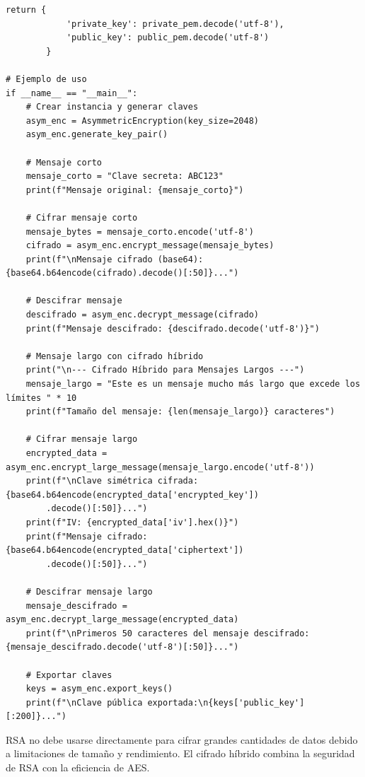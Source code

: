 \documentclass[12pt,a4paper]{article}
\begin{document}
\begin{lstlisting}[caption=Implementación de cifrado asimétrico con RSA]
        return {
            'private_key': private_pem.decode('utf-8'),
            'public_key': public_pem.decode('utf-8')
        }

# Ejemplo de uso
if __name__ == "__main__":
    # Crear instancia y generar claves
    asym_enc = AsymmetricEncryption(key_size=2048)
    asym_enc.generate_key_pair()
    
    # Mensaje corto
    mensaje_corto = "Clave secreta: ABC123"
    print(f"Mensaje original: {mensaje_corto}")
    
    # Cifrar mensaje corto
    mensaje_bytes = mensaje_corto.encode('utf-8')
    cifrado = asym_enc.encrypt_message(mensaje_bytes)
    print(f"\nMensaje cifrado (base64): {base64.b64encode(cifrado).decode()[:50]}...")
    
    # Descifrar mensaje
    descifrado = asym_enc.decrypt_message(cifrado)
    print(f"Mensaje descifrado: {descifrado.decode('utf-8')}")
    
    # Mensaje largo con cifrado híbrido
    print("\n--- Cifrado Híbrido para Mensajes Largos ---")
    mensaje_largo = "Este es un mensaje mucho más largo que excede los límites " * 10
    print(f"Tamaño del mensaje: {len(mensaje_largo)} caracteres")
    
    # Cifrar mensaje largo
    encrypted_data = asym_enc.encrypt_large_message(mensaje_largo.encode('utf-8'))
    print(f"\nClave simétrica cifrada: {base64.b64encode(encrypted_data['encrypted_key'])
        .decode()[:50]}...")
    print(f"IV: {encrypted_data['iv'].hex()}")
    print(f"Mensaje cifrado: {base64.b64encode(encrypted_data['ciphertext'])
        .decode()[:50]}...")
    
    # Descifrar mensaje largo
    mensaje_descifrado = asym_enc.decrypt_large_message(encrypted_data)
    print(f"\nPrimeros 50 caracteres del mensaje descifrado: {mensaje_descifrado.decode('utf-8')[:50]}...")
    
    # Exportar claves
    keys = asym_enc.export_keys()
    print(f"\nClave pública exportada:\n{keys['public_key'][:200]}...")
\end{lstlisting}

\begin{securityalert}
	RSA no debe usarse directamente para cifrar grandes cantidades de datos debido a limitaciones de tamaño y rendimiento. El cifrado híbrido combina la seguridad de RSA con la eficiencia de AES.
\end{securityalert}

\newpage
\end{document}
